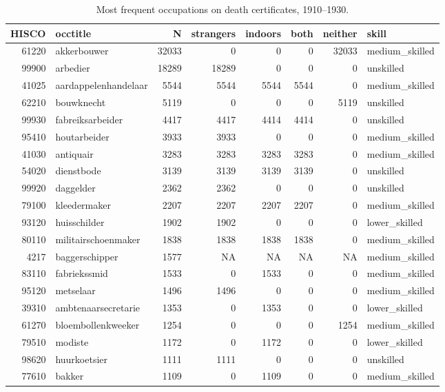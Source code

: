\begin{table}

\caption{\label{tab:tab:topoccs_overal}Most frequent occupations on death certificates, 1910–1930.}
\centering
\begin{tabular}[t]{r|l|r|r|r|r|r|l}
\hline
HISCO & occtitle & N & strangers & indoors & both & neither & skill\\
\hline
61220 & akkerbouwer & 32033 & 0 & 0 & 0 & 32033 & medium\_skilled\\
\hline
99900 & arbedier & 18289 & 18289 & 0 & 0 & 0 & unskilled\\
\hline
41025 & aardappelenhandelaar & 5544 & 5544 & 5544 & 5544 & 0 & medium\_skilled\\
\hline
62210 & bouwknecht & 5119 & 0 & 0 & 0 & 5119 & unskilled\\
\hline
99930 & fabreiksarbeider & 4417 & 4417 & 4414 & 4414 & 0 & unskilled\\
\hline
95410 & houtarbeider & 3933 & 3933 & 0 & 0 & 0 & medium\_skilled\\
\hline
41030 & antiquair & 3283 & 3283 & 3283 & 3283 & 0 & medium\_skilled\\
\hline
54020 & dienstbode & 3139 & 3139 & 3139 & 3139 & 0 & unskilled\\
\hline
99920 & daggelder & 2362 & 2362 & 0 & 0 & 0 & unskilled\\
\hline
79100 & kleedermaker & 2207 & 2207 & 2207 & 2207 & 0 & medium\_skilled\\
\hline
93120 & huisschilder & 1902 & 1902 & 0 & 0 & 0 & lower\_skilled\\
\hline
80110 & militairschoenmaker & 1838 & 1838 & 1838 & 1838 & 0 & medium\_skilled\\
\hline
4217 & baggerschipper & 1577 & NA & NA & NA & NA & medium\_skilled\\
\hline
83110 & fabriekssmid & 1533 & 0 & 1533 & 0 & 0 & medium\_skilled\\
\hline
95120 & metselaar & 1496 & 1496 & 0 & 0 & 0 & medium\_skilled\\
\hline
39310 & ambtenaarsecretarie & 1353 & 0 & 1353 & 0 & 0 & lower\_skilled\\
\hline
61270 & bloembollenkweeker & 1254 & 0 & 0 & 0 & 1254 & medium\_skilled\\
\hline
79510 & modiste & 1172 & 0 & 1172 & 0 & 0 & lower\_skilled\\
\hline
98620 & huurkoetsier & 1111 & 1111 & 0 & 0 & 0 & unskilled\\
\hline
77610 & bakker & 1109 & 0 & 1109 & 0 & 0 & medium\_skilled\\
\hline
\end{tabular}
\end{table}

